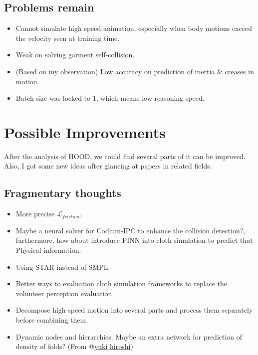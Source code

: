 \documentclass{article}
\begin{document}
\subsection{Problems remain}
\begin{itemize}
    \item Cannot simulate high speed animation, especially when body motions exceed the velocity seen at training time.
    \item Weak on solving garment self-collision.
    \item (Based on my observation) Low accuracy on prediction of inertia \& creases in motion.
    \item Batch size was locked to 1, which means low reasoning speed.
\end{itemize}

\section{Possible Improvements}
\par After the analysis of HOOD, we could find several parts of it can be improved. Also, I got some new ideas after glancing at papers in related fields.
\subsection{Fragmentary thoughts}
\begin{itemize}
    \item More precise $\mathcal{L}_{friction}$.
    \item Maybe a neural solver for Codium-IPC\cite{li2020codimensional} to enhance the collision detection?, furthermore, how about introduce PINN into cloth simulation to predict that Physical information.
    \item Using STAR\cite{STAR:2020} instead of SMPL\cite{SMPL:2015}.
    \item Better ways to evaluation cloth simulation frameworks to replace the volunteer perception evaluation.
    \item Decompose high-speed motion into several parts and process them separately before combining them.
    \item Dynamic nodes and hierarchies. Maybe an extra network for prediction of density of folds? (From \href{https://github.com/Zhaiyuqing2003}{$@$yuki$\_$hiroshi})
\end{itemize}
\end{document}

